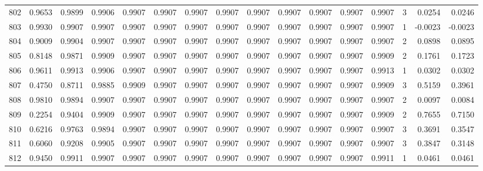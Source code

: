 \begin{tabular}{lrrrrrrrrrrrrrrr}
802 &      0.9653 &  0.9899 &  0.9906 &  0.9907 &  0.9907 &  0.9907 &  0.9907 &  0.9907 &  0.9907 &  0.9907 &   0.9907 &     0.9907 &      3 &                    0.0254 &                     0.0246 \\
803 &      0.9930 &  0.9907 &  0.9907 &  0.9907 &  0.9907 &  0.9907 &  0.9907 &  0.9907 &  0.9907 &  0.9907 &   0.9907 &     0.9907 &      1 &                   -0.0023 &                    -0.0023 \\
804 &      0.9009 &  0.9904 &  0.9907 &  0.9907 &  0.9907 &  0.9907 &  0.9907 &  0.9907 &  0.9907 &  0.9907 &   0.9907 &     0.9907 &      2 &                    0.0898 &                     0.0895 \\
805 &      0.8148 &  0.9871 &  0.9909 &  0.9907 &  0.9907 &  0.9907 &  0.9907 &  0.9907 &  0.9907 &  0.9907 &   0.9907 &     0.9909 &      2 &                    0.1761 &                     0.1723 \\
806 &      0.9611 &  0.9913 &  0.9906 &  0.9907 &  0.9907 &  0.9907 &  0.9907 &  0.9907 &  0.9907 &  0.9907 &   0.9907 &     0.9913 &      1 &                    0.0302 &                     0.0302 \\
807 &      0.4750 &  0.8711 &  0.9885 &  0.9909 &  0.9907 &  0.9907 &  0.9907 &  0.9907 &  0.9907 &  0.9907 &   0.9907 &     0.9909 &      3 &                    0.5159 &                     0.3961 \\
808 &      0.9810 &  0.9894 &  0.9907 &  0.9907 &  0.9907 &  0.9907 &  0.9907 &  0.9907 &  0.9907 &  0.9907 &   0.9907 &     0.9907 &      2 &                    0.0097 &                     0.0084 \\
809 &      0.2254 &  0.9404 &  0.9909 &  0.9907 &  0.9907 &  0.9907 &  0.9907 &  0.9907 &  0.9907 &  0.9907 &   0.9907 &     0.9909 &      2 &                    0.7655 &                     0.7150 \\
810 &      0.6216 &  0.9763 &  0.9894 &  0.9907 &  0.9907 &  0.9907 &  0.9907 &  0.9907 &  0.9907 &  0.9907 &   0.9907 &     0.9907 &      3 &                    0.3691 &                     0.3547 \\
811 &      0.6060 &  0.9208 &  0.9905 &  0.9907 &  0.9907 &  0.9907 &  0.9907 &  0.9907 &  0.9907 &  0.9907 &   0.9907 &     0.9907 &      3 &                    0.3847 &                     0.3148 \\
812 &      0.9450 &  0.9911 &  0.9907 &  0.9907 &  0.9907 &  0.9907 &  0.9907 &  0.9907 &  0.9907 &  0.9907 &   0.9907 &     0.9911 &      1 &                    0.0461 &                     0.0461 \\

\end{tabular}
